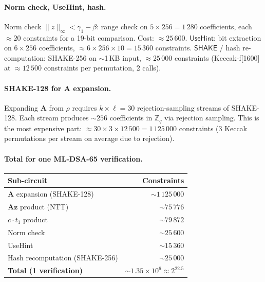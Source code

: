 \documentclass[11pt]{article}
\begin{document}
\paragraph{Norm check, UseHint, hash.}
Norm check $\|z\|_\infty < \gamma_1 - \beta$: range check on
$5 \times 256 = 1\,280$ coefficients, each $\approx 20$ constraints
for a 19-bit comparison.  Cost: $\approx 25\,600$.
$\mathsf{UseHint}$: bit extraction on $6 \times 256$ coefficients,
$\approx 6 \times 256 \times 10 = 15\,360$ constraints.
$\mathsf{SHAKE}$ / hash re-computation: SHAKE-256 on $\sim$1\,KB
input, $\approx 25\,000$ constraints (Keccak-f[1600] at $\approx
12\,500$ constraints per permutation, 2 calls).

\paragraph{SHAKE-128 for $\mathbf{A}$ expansion.}
Expanding $\mathbf{A}$ from $\rho$ requires $k \times \ell = 30$
rejection-sampling streams of SHAKE-128.  Each stream produces
$\sim 256$ coefficients in $\mathbb{Z}_q$ via rejection sampling.
This is the most expensive part: $\approx 30 \times 3 \times 12\,500
= 1\,125\,000$ constraints (3 Keccak permutations per stream on
average due to rejection).

\paragraph{Total for one ML-DSA-65 verification.}

\begin{center}
\begin{tabular}{lr}
\toprule
\textbf{Sub-circuit} & \textbf{Constraints} \\
\midrule
$\mathbf{A}$ expansion (SHAKE-128)    & $\sim 1\,125\,000$ \\
$\mathbf{A}\mathbf{z}$ product (NTT)  & $\sim 75\,776$ \\
$c \cdot t_1$ product                  & $\sim 79\,872$ \\
Norm check                             & $\sim 25\,600$ \\
UseHint                                & $\sim 15\,360$ \\
Hash recomputation (SHAKE-256)         & $\sim 25\,000$ \\
\midrule
\textbf{Total (1 verification)}        & $\sim 1.35 \times 10^6 \approx 2^{22.5}$ \\
\bottomrule
\end{tabular}
\end{center}
\end{document}
